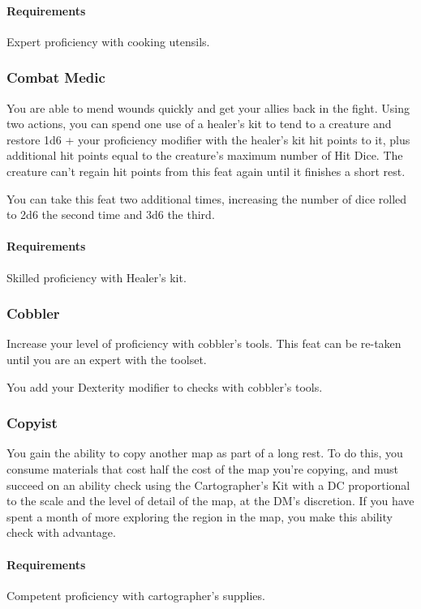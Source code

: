     \paragraph{Requirements} Expert proficiency with cooking utensils.
\subsubsection{Combat Medic} \label{feat::combatmedic}
    You are able to mend wounds quickly and get your allies back in the fight.
    Using two actions, you can spend one use of a healer's kit to tend to a creature and restore 1d6 + your proficiency modifier with the healer's kit hit points to it, plus additional hit points equal to the creature's maximum number of Hit Dice.
    The creature can't regain hit points from this feat again until it finishes a short rest.

    You can take this feat two additional times, increasing the number of dice rolled to 2d6 the second time and 3d6 the third.
    \paragraph{Requirements} Skilled proficiency with Healer's kit.
\subsubsection{Cobbler} \label{feat::cobbler}
    Increase your level of proficiency with cobbler's tools.
    This feat can be re-taken until you are an expert with the toolset.

    You add your Dexterity modifier to checks with cobbler's tools.
\subsubsection{Copyist} \label{feat::copyist}
    You gain the ability to copy another map as part of a long rest.
    To do this, you consume materials that cost half the cost of the map you're copying, and must succeed on an ability check using the Cartographer's Kit with a DC proportional to the scale and the level of detail of the map, at the DM's discretion.
    If you have spent a month of more exploring the region in the map, you make this ability check with advantage.
    \paragraph{Requirements} Competent proficiency with cartographer's supplies.

